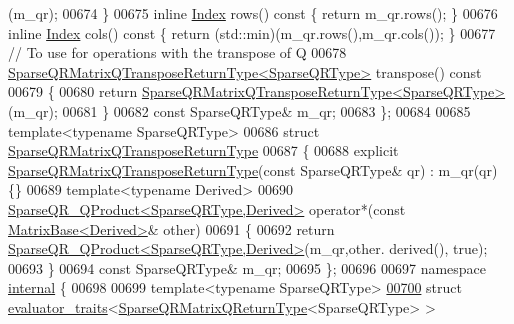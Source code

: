 \begin{DoxyCode}
      (m\_qr);
00674   \}
00675   \textcolor{keyword}{inline} \hyperlink{namespace_eigen_a62e77e0933482dafde8fe197d9a2cfde}{Index} rows()\textcolor{keyword}{ const }\{ \textcolor{keywordflow}{return} m\_qr.rows(); \}
00676   \textcolor{keyword}{inline} \hyperlink{namespace_eigen_a62e77e0933482dafde8fe197d9a2cfde}{Index} cols()\textcolor{keyword}{ const }\{ \textcolor{keywordflow}{return} (std::min)(m\_qr.rows(),m\_qr.cols()); \}
00677   \textcolor{comment}{// To use for operations with the transpose of Q}
00678   \hyperlink{struct_eigen_1_1_sparse_q_r_matrix_q_transpose_return_type}{SparseQRMatrixQTransposeReturnType<SparseQRType>} 
      transpose()\textcolor{keyword}{ const}
00679 \textcolor{keyword}{  }\{
00680     \textcolor{keywordflow}{return} \hyperlink{struct_eigen_1_1_sparse_q_r_matrix_q_transpose_return_type}{SparseQRMatrixQTransposeReturnType<SparseQRType>}
      (m\_qr);
00681   \}
00682   \textcolor{keyword}{const} SparseQRType& m\_qr;
00683 \};
00684 
00685 \textcolor{keyword}{template}<\textcolor{keyword}{typename} SparseQRType>
00686 \textcolor{keyword}{struct }\hyperlink{struct_eigen_1_1_sparse_q_r_matrix_q_transpose_return_type}{SparseQRMatrixQTransposeReturnType}
00687 \{
00688   \textcolor{keyword}{explicit} \hyperlink{struct_eigen_1_1_sparse_q_r_matrix_q_transpose_return_type}{SparseQRMatrixQTransposeReturnType}(\textcolor{keyword}{const} SparseQRType& qr) : 
      m\_qr(qr) \{\}
00689   \textcolor{keyword}{template}<\textcolor{keyword}{typename} Derived>
00690   \hyperlink{struct_eigen_1_1_sparse_q_r___q_product}{SparseQR\_QProduct<SparseQRType,Derived>} operator*(\textcolor{keyword}{const} 
      \hyperlink{group___core___module_class_eigen_1_1_matrix_base}{MatrixBase<Derived>}& other)
00691   \{
00692     \textcolor{keywordflow}{return} \hyperlink{struct_eigen_1_1_sparse_q_r___q_product}{SparseQR\_QProduct<SparseQRType,Derived>}(m\_qr,other.
      derived(), \textcolor{keyword}{true});
00693   \}
00694   \textcolor{keyword}{const} SparseQRType& m\_qr;
00695 \};
00696 
00697 \textcolor{keyword}{namespace }\hyperlink{namespaceinternal}{internal} \{
00698   
00699 \textcolor{keyword}{template}<\textcolor{keyword}{typename} SparseQRType>
\hyperlink{struct_eigen_1_1internal_1_1evaluator__traits_3_01_sparse_q_r_matrix_q_return_type_3_01_sparse_q_r_type_01_4_01_4}{00700} \textcolor{keyword}{struct }\hyperlink{struct_eigen_1_1internal_1_1evaluator__traits}{evaluator\_traits}<\hyperlink{struct_eigen_1_1_sparse_q_r_matrix_q_return_type}{SparseQRMatrixQReturnType}<SparseQRType> >

\end{DoxyCode}
